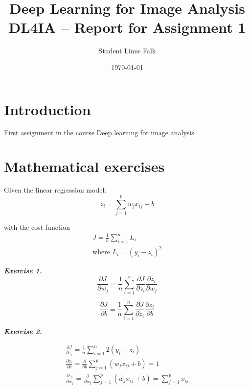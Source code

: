 \documentclass[a4paper,10pt]{article}
\title{\textbf{Deep Learning for Image Analysis} 
\\ DL4IA -- Report for Assignment 1}
\author{Student Linus Falk}
\date{\today}
\begin{document}
\lstset{language=Python}
\maketitle

\section{Introduction}
First assignment in the course Deep learning for image analysis

\section{Mathematical exercises}

Given the linear regression model:
\begin{equation}
    z_i = \sum_{j=1}^p w_jx_{ij} + b 
\end{equation}

with the cost function 
\begin{equation}
\label{eq:cost}
\begin{split}
    J = \frac{1}{n}\sum_{i=1}^nL_i \\
    \text{where } L_i = (y_i-z_i)^2    
\end{split}
\end{equation}



\textit{\textbf{Exercise 1.}}
\begin{equation*}
    \frac{\partial J} {\partial w_j} = \frac{1} {n} \sum_{i=1}^{n} \frac{\partial J} {\partial z_i}  \frac{\partial z_i} {\partial w_j} 
\end{equation*}

\begin{equation*}
   \frac{\partial J} {\partial b}  = \frac{1} {n} \sum_{i=1}^{n} \frac{\partial J} {\partial z_i}  \frac{\partial z_i} {\partial b} 
\end{equation*}


\textit{\textbf{Exercise 2.}}

\begin{equation*}
\begin{split}
    \frac{\partial J}{\partial z_i} = \frac{1} {n} \sum_{i=1}^{n}  2(y_i-z_i) \\
    \frac{\partial z_i} {\partial b} = \frac{\partial} {\partial b}  \sum_{j=1}^p (w_jx_{ij}+b) = 1 \\
    \frac{\partial z_i} {\partial w_j} = \frac{\partial} {\partial w_j} \sum_{j=1}^p (w_jx_{ij}+b) = \sum_{j=1}^p x_{ij}
\end{split}
\end{equation*}
\end{document}
